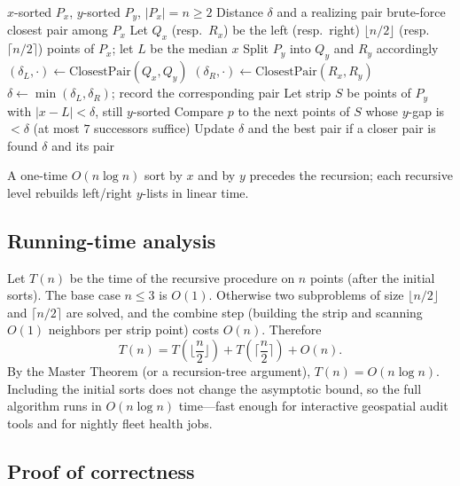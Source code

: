 \documentclass[sigconf,review=false]{acmart}
\theoremstyle{definition}
\begin{document}
\begin{algorithm}[t]
\caption{Closest Pair (divide and conquer)}
\label{alg:cp}
\begin{algorithmic}[1]
\Require $x$-sorted $P_x$, $y$-sorted $P_y$, $|P_x|=n\ge 2$
\Ensure Distance $\delta$ and a realizing pair
  \State \Return brute-force closest pair among $P_x$
\EndIf
\State Let $Q_x$ (resp.\ $R_x$) be the left (resp.\ right) $\lfloor n/2\rfloor$
      (resp.\ $\lceil n/2\rceil$) points of $P_x$; let $L$ be the median $x$
\State Split $P_y$ into $Q_y$ and $R_y$ accordingly
\State $(\delta_L,\cdot) \gets \mathrm{ClosestPair}(Q_x,Q_y)$
\State $(\delta_R,\cdot) \gets \mathrm{ClosestPair}(R_x,R_y)$
\State $\delta \gets \min(\delta_L,\delta_R)$; record the corresponding pair
\State Let strip $S$ be points of $P_y$ with $|x-L|<\delta$, still $y$-sorted
  \State Compare $p$ to the next points of $S$ whose $y$-gap is $<\delta$
        (at most $7$ successors suffice)
  \State Update $\delta$ and the best pair if a closer pair is found
\EndFor
\State \Return $\delta$ and its pair
\end{algorithmic}
\end{algorithm}

A one-time $O(n\log n)$ sort by $x$ and by $y$ precedes the recursion; each
recursive level rebuilds left/right $y$-lists in linear time.

\subsection{Running-time analysis}
\label{sec:dac-rt}

Let $T(n)$ be the time of the recursive procedure on $n$ points (after the
initial sorts). The base case $n\le 3$ is $O(1)$. Otherwise two subproblems
of size $\lfloor n/2\rfloor$ and $\lceil n/2\rceil$ are solved, and the
combine step (building the strip and scanning $O(1)$ neighbors per strip
point) costs $O(n)$. Therefore
\[
  T(n) = T\!\left(\Big\lfloor\frac{n}{2}\Big\rfloor\right)
       + T\!\left(\Big\lceil\frac{n}{2}\Big\rceil\right) + O(n).
\]
By the Master Theorem (or a recursion-tree argument), $T(n)=O(n\log n)$.
Including the initial sorts does not change the asymptotic bound, so the
full algorithm runs in $O(n\log n)$ time---fast enough for interactive
geospatial audit tools and for nightly fleet health jobs.

\subsection{Proof of correctness}
\label{sec:dac-proof}
\end{document}
